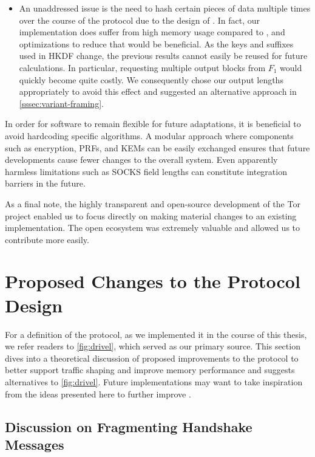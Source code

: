 \begin{itemize}
    \item An unaddressed issue is the need to hash certain pieces of data multiple times over the course of the protocol due to the design of \drivel{}. In fact, our implementation does suffer from high memory usage compared to \obfsfour{}, and optimizations to reduce that would be beneficial. As the keys and suffixes used in HKDF change, the previous results cannot easily be reused for future calculations. In particular, requesting multiple output blocks from $F_1$ would quickly become quite costly. We consequently chose our output lengths appropriately to avoid this effect and suggested an alternative approach in \cref{sssec:variant-framing}.
\end{itemize}

In order for software to remain flexible for future adaptations, it is beneficial to avoid hardcoding specific algorithms. A modular approach where components such as encryption, PRFs, and KEMs can be easily exchanged ensures that future developments cause fewer changes to the overall system. Even apparently harmless limitations such as SOCKS field lengths can constitute integration barriers in the future.

As a final note, the highly transparent and open-source development of the Tor project enabled us to focus directly on making material changes to an existing implementation. The open ecosystem was extremely valuable and allowed us to contribute more easily.

\section{Proposed Changes to the Protocol Design} \label{sec:protocol-changes}

For a definition of the \drivel{} protocol, as we implemented it in the course of this thesis, we refer readers to \cref{fig:drivel}, which served as our primary source.
This section dives into a theoretical discussion of proposed improvements to the protocol to better support traffic shaping and improve memory performance and suggests alternatives to \cref{fig:drivel}.
Future implementations may want to take inspiration from the ideas presented here to further improve \drivel{}.

\subsection{Discussion on Fragmenting Handshake Messages} \label{ssec:fragmentation}

